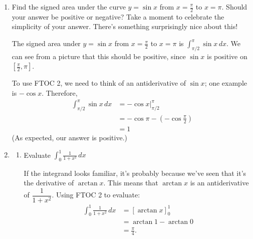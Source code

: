 \documentclass[main]{subfiles}
\begin{document}
\begin{enumerate}[resume]
\item 
  \begin{problem}[\stretch{1.25}]
    Find the signed area under the curve $y=\sin x$ from $x=\frac{\pi}{2}$
    to $x=\pi$. Should your answer be positive or negative? Take a moment
    to celebrate the simplicity of your answer. There's something
    surprisingly nice about this!
  \end{problem}

  \begin{solution}
    The signed area under $y = \sin x$ from $x = \frac{\pi}{2}$ to $x =
    \pi$ is $\displaystyle \int_{\pi/2}^\pi \sin x\,dx$.  We can see from
    a picture that this should be positive, since $\sin x$ is positive on
    $\left[ \frac{\pi}{2}, \pi \right]$.

    To use FTOC 2, we need to think of an antiderivative of $\sin x$; one
    example is $-\cos x$.  Therefore, 
    \begin{align*}
      \int_{\pi/2}^\pi \sin x\,dx &= - \cos x \Big|_{\pi / 2}^\pi \\
      &= - \cos \pi - \left( - \cos \frac{\pi}{2} \right) \\
      &= \boxed{1}
    \end{align*}
    (As expected, our answer is positive.)
  \end{solution}
  
\pspace{\newpage}

\item
  \begin{enumerate}
    \item 
    \begin{problem}[\stretch{0.75}]
    Evaluate $\displaystyle \int_0^1 \frac{1}{1+x^2}\,dx$
    \end{problem}

    \begin{solution}
       If the integrand looks familiar, it's 
        probably because
        we've seen that it's the derivative of $\arctan x$. This
        means that $\arctan x$ is an antiderivative of $\dfrac{1}{1+x^2}$.
        Using FTOC 2 to evaluate:
        \begin{align*}
            \int_0^1 \frac{1}{1+x^2}\,dx &= \left[\arctan x\right]_0^1 \\
            &= \arctan 1 - \arctan 0 \\
            &= \boxed{\frac{\pi}{4}.}
        \end{align*}
    \end{solution}


\end{enumerate}
\end{enumerate}
\end{document}
